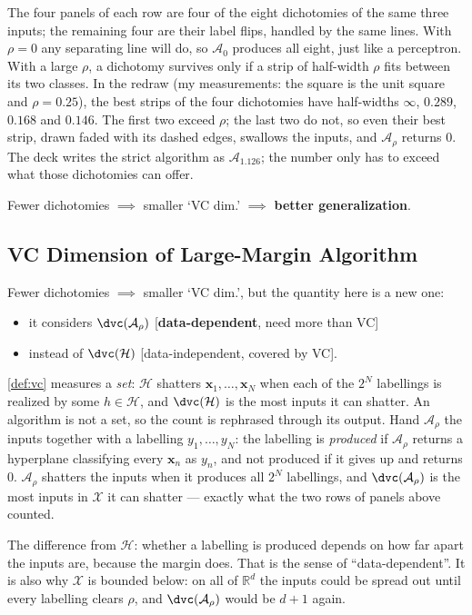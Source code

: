 The four panels of each row are four of the eight dichotomies of the same
three inputs; the remaining four are their label flips, handled by the same
lines. With \(\rho = 0\) any separating line will do, so \(\mathcal{A}_0\)
produces all eight, just like a perceptron. With a large \(\rho\), a
dichotomy survives only if a strip of half-width \(\rho\) fits between its
two classes. In the redraw (my measurements: the square is the unit square
and \(\rho = 0.25\)), the best strips of the four dichotomies have half-widths
\(\infty\), \(0.289\), \(0.168\) and \(0.146\). The first two exceed \(\rho\);
the last two do not, so even their best strip, drawn faded with its dashed
edges, swallows the inputs, and \(\mathcal{A}_\rho\) returns \(0\). The deck
writes the strict algorithm as \(\mathcal{A}_{1.126}\); the number only has to
exceed what those dichotomies can offer.

\begin{moral}
    Fewer dichotomies \(\implies\) smaller `VC dim.' \(\implies\)
    \textbf{better generalization}.
\end{moral}

\subsection{VC Dimension of Large-Margin Algorithm}

Fewer dichotomies \(\implies\) smaller `VC dim.', but the quantity here is a
new one:
\begin{itemize}
    \item it considers \(\dvc(\mathcal{A}_\rho)\) [\textbf{data-dependent},
        need more than VC]
    \item instead of \(\dvc(\mathcal{H})\) [data-independent, covered by VC].
\end{itemize}
\begin{remark}
    \autoref{def:vc} measures a \emph{set}: \(\mathcal{H}\) shatters
    \(\bm{x}_1, \dots, \bm{x}_N\) when each of the \(2^N\) labellings is
    realized by some \(h \in \mathcal{H}\), and \(\dvc(\mathcal{H})\) is the
    most inputs it can shatter. An algorithm is not a set, so the count is
    rephrased through its output. Hand \(\mathcal{A}_\rho\) the inputs
    together with a labelling \(y_1, \dots, y_N\): the labelling is
    \emph{produced} if \(\mathcal{A}_\rho\) returns a hyperplane classifying
    every \(\bm{x}_n\) as \(y_n\), and not produced if it gives up and returns
    \(0\). \(\mathcal{A}_\rho\) shatters the inputs when it produces all
    \(2^N\) labellings, and \(\dvc(\mathcal{A}_\rho)\) is the most inputs in
    \(\mathcal{X}\) it can shatter --- exactly what the two rows of panels
    above counted.

    The difference from \(\mathcal{H}\): whether a labelling is produced
    depends on how far apart the inputs are, because the margin does. That is
    the sense of ``data-dependent''. It is also why \(\mathcal{X}\) is bounded
    below: on all of \(\mathbb{R}^d\) the inputs could be spread out until
    every labelling clears \(\rho\), and \(\dvc(\mathcal{A}_\rho)\) would be
    \(d + 1\) again.
\end{remark}

